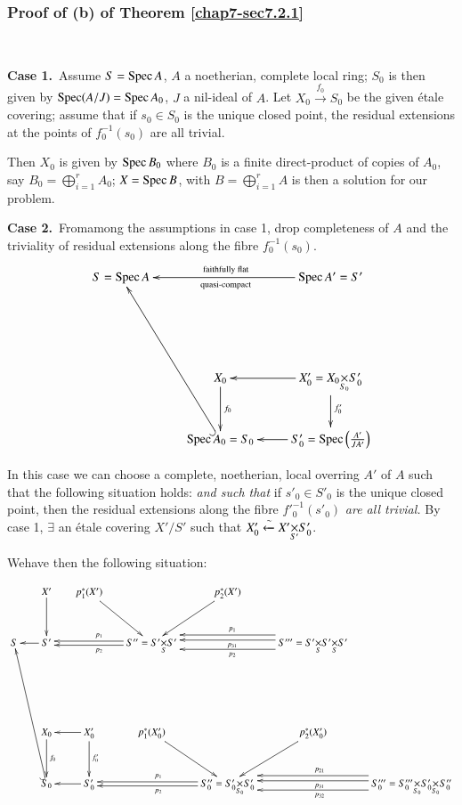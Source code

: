 \setcounter{subsubsection}{5}
\subsubsection{Proof of (b) of Theorem
  \ref{chap7-sec7.2.1}}\label{chap7-sec7.2.1.6} 

~

\medskip
\noindent
{\bf Case 1.}~Assume $S=\operatorname{Spec} A$, $A$ a noetherian, complete local
ring; $S_{0}$ is then given by $\operatorname{Spec} (A/J)=\operatorname{Spec} A_{0}$, $J$ a
nil-ideal of $A$. Let $X_{0}\xrightarrow{f_{0}}S_{0}$ be the given
\'etale covering; assume that if $s_{0}\in S_{0}$ is the unique closed
point, the residual extensions at the points of $f^{-1}_{0}(s_{0})$
are all trivial.

Then $X_{0}$ is given by $\operatorname{Spec} B_{0}$ where $B_{0}$ is a finite
direct-product of copies of $A_{0}$, say
$B_{0}=\bigoplus^{r}_{i=1}A_{0}$; $X=\operatorname{Spec} B$, with
$B=\bigoplus^{r}_{i=1}A$ is then a solution for our problem.

\medskip
\noindent
{\bf Case 2.}~From\pageoriginale among the assumptions in case 1, drop
completeness of $A$ and the triviality of residual extensions along
the fibre $f^{-1}_{0}(s_{0})$.
\[
\xymatrix@R=1cm{
S=\Spec A & & \Spec A'=S'\ar[ll]_{\text{faithfully
    flat}}^{\text{quasi-compact}}\\
 & & \\
 & X_{0}\ar[d]^{f_{0}} &
X'_{0}=\fprod{X_{0}}{S'_{0}}{S_{0}}\ar[d]^{f'_{0}}\ar[l]\\
 &\ar@{^{(}->}[uuul] \Spec A_{0}=S_{0} & S'_{0}=\Spec \left(\frac{A'}{JA'}\right)\ar[l]
}
\]

In this case we can choose a complete, noetherian, local overring $A'$
of $A$ such that the following situation holds:
{\em and such that} if $s'_{0}\in S'_{0}$ is the unique closed point,
then the residual extensions along the fibre ${f'}^{-1}_{0}(s'_{0})$
{\em are all trivial.} By case 1, $\exists$ an \'etale covering
$X'/S'$ such that $X'_{0}\xleftarrow{\sim}\fprod{X'}{S'_{0}}{S'}$. 


We\pageoriginale have then the following situation:
\begin{landscape}
\begin{equation*}
\xymatrix@C=.6cm@R=1.1cm{
 & X'\ar[d] & p^{\ast}_{1}(X')\ar[dr] & & p^{\ast}_{2}(X')\ar[dl] & \\
S & \ar[l] S' & & \ar@<-.2em>[ll]_{p_{1}}\ar@<.2em>[ll]^{p_{2}} S''=\fprod{S'}{S'}{S} & &
S'''=\fprod{S'}{\fprod{S'}{S'}{S}}{S} \ar@<-.8em>[ll]_{p_{1}}\ar@<-.3em>[ll]^{p_{31}}\ar@<.6em>[ll]^{p_{2}}\\ 
 & & \\
 & X_{0}\ar[d]^{f_{0}} &
X'_{0}\ar[d]^{f'_{0}}\ar[l] & p^{\ast}_{1}(X'_{0})\ar[dr] & &
p^{\ast}_{2}(X'_{0})\ar[dl] &\\
 &\ar@{^{(}->}[uuul] S_{0} & S'_{0}\ar[l] & &
S''_{0}=\fprod{S'_{0}}{S'_{0}}{S_{0}}\ar@<-.2em>[ll]_{p_{1}}\ar@<.2em>[ll]^{p_{2}}
& & S'''_{0}=\fprod{S'''_{0}}{\fprod{S'_{0}}{S''_{0}}{S_{0}}}{S_{0}} 
\ar@<-.8em>[ll]_{p_{21}}\ar@<-.3em>[ll]^{p_{31}}\ar@<.6em>[ll]^{p_{32}}
}
\end{equation*}
\end{landscape}

